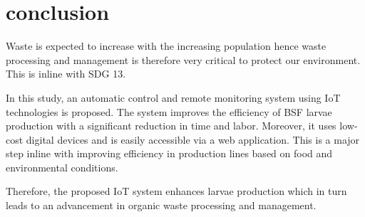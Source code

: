 \documentclass[conference]{IEEEtran}
\begin{document}
\section{conclusion}

Waste is expected to increase with the increasing population hence waste processing and management is therefore very critical to protect our environment. This is inline with SDG 13.

In this study, an automatic control and remote monitoring system using IoT technologies is proposed.
The system improves the efficiency of BSF larvae production with a significant reduction in time and labor. Moreover, it uses low-cost digital devices and is easily accessible via a web application.  This is a major step inline with improving efficiency in production lines based on food and environmental conditions.

Therefore, the proposed IoT system enhances larvae production which in turn leads to an advancement in organic waste processing and management. 
\end{document}
